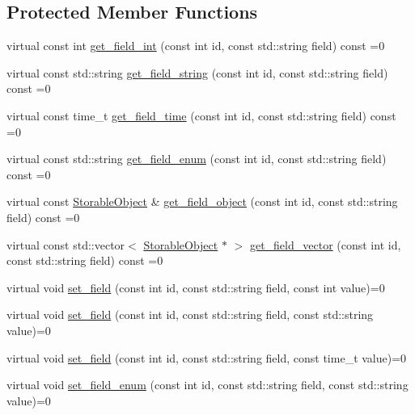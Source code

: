 \subsection*{Protected Member Functions}
\begin{DoxyCompactItemize}
\item 
virtual const int \hyperlink{classStorage_1_1AbstractStorage_a80a7e4ab87a0326aa8b5571b09d55eaa}{get\_\-field\_\-int} (const int id, const std::string field) const =0
\item 
virtual const std::string \hyperlink{classStorage_1_1AbstractStorage_ad12a3abb791ef5a696196c28e643ec22}{get\_\-field\_\-string} (const int id, const std::string field) const =0
\item 
virtual const time\_\-t \hyperlink{classStorage_1_1AbstractStorage_a87fe8d51934ab2403758d905ef313272}{get\_\-field\_\-time} (const int id, const std::string field) const =0
\item 
virtual const std::string \hyperlink{classStorage_1_1AbstractStorage_acd7e88a005b6873632c7f20245e5f3f7}{get\_\-field\_\-enum} (const int id, const std::string field) const =0
\item 
virtual const \hyperlink{classStorage_1_1StorableObject}{StorableObject} \& \hyperlink{classStorage_1_1AbstractStorage_ac795e31d42a58c501702f443259b4d43}{get\_\-field\_\-object} (const int id, const std::string field) const =0
\item 
virtual const std::vector$<$ \hyperlink{classStorage_1_1StorableObject}{StorableObject} $\ast$ $>$ \hyperlink{classStorage_1_1AbstractStorage_ae7c30697d68dc9d7de595388030d8e10}{get\_\-field\_\-vector} (const int id, const std::string field) const =0
\item 
virtual void \hyperlink{classStorage_1_1AbstractStorage_acdd090d0beb6a8241914e7d78a7f2c0c}{set\_\-field} (const int id, const std::string field, const int value)=0
\item 
virtual void \hyperlink{classStorage_1_1AbstractStorage_ae5ee00e647f121b68ebada0f094058bc}{set\_\-field} (const int id, const std::string field, const std::string value)=0
\item 
virtual void \hyperlink{classStorage_1_1AbstractStorage_a50ee4a829bc067a9291a11aa99ec0f16}{set\_\-field} (const int id, const std::string field, const time\_\-t value)=0
\item 
virtual void \hyperlink{classStorage_1_1AbstractStorage_a50925678c74c09acd8549a541fdbbe9f}{set\_\-field\_\-enum} (const int id, const std::string field, const std::string value)=0
\item 

\end{DoxyCompactItemize}

